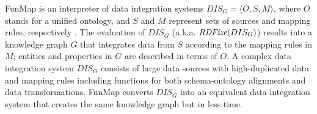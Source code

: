 FunMap is an interpreter of data integration systems $DIS_G = \langle O,S,M \rangle$, where $O$ stands for a unified ontology, and $S$ and $M$ represent sets of sources and mapping rules, respectively \citep{Lenzerini02}. The evaluation of $DIS_G$ (a.k.a. $\emph{RDFize}(DIS_G)$) results into a knowledge graph $G$ that integrates data from $S$ according to the mapping rules in $M$; entities and properties in $G$ are described in terms of $O$. A complex data integration system $DIS_G$ consists of large data sources with high-duplicated data and mapping rules including functions for both schema-ontology alignments and data transformations. FunMap converts $DIS_G$ into an equivalent data integration system that creates the same knowledge graph but in less time.


